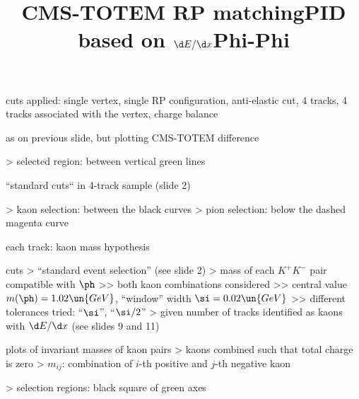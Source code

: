 \> cuts applied: single vertex, single RP configuration, anti-elastic cut, 4 tracks, 4 tracks associated with the vertex, charge balance

\centerline{}


\newpage %
\title{CMS-TOTEM RP matching}

\> as on previous slide, but plotting CMS-TOTEM difference

\centerline{}

\>> selected region: between vertical green lines


\newpage %
\title{PID based on $\d E/\d x$}

\> ``standard cuts`` in 4-track sample (slide 2)

\centerline{}

\>> kaon selection: between the black curves
\>> pion selection: below the dashed magenta curve


\newpage %
\title{Phi-Phi}

\> each track: kaon mass hypothesis

\> cuts
\>> ``standard event selection'' (see slide 2)
\>> mass of each $K^+ K^-$ pair compatible with $\ph$
\>>> both kaon combinations considered
\>>> central value $m(\ph) = 1.02\un{GeV}$, ``window'' width $\si = 0.02\un{GeV}$
\>>> different tolerances tried: ``$\si$'', ``$\si/2$''
\>> given number of tracks identified as kaons with $\d E/\d x$ (see slides 9 and 11)


\newpage %

\> plots of invariant masses of kaon pairs
\>> kaons combined such that total charge is zero
\>> $m_{ij}$: combination of $i$-th positive and $j$-th negative kaon

\centerline{}

\>> selection regions: black square of green axes



\newpage %

